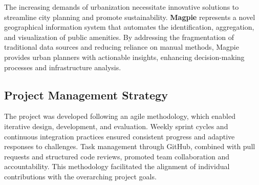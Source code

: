 The increasing demands of urbanization necessitate innovative solutions to
streamline city planning and promote sustainability. \textbf{Magpie} represents
a novel geographical information system that automates the identification,
aggregation, and visualization of public amenities. By addressing the
fragmentation of traditional data sources and reducing reliance on manual
methods, Magpie provides urban planners with actionable insights, enhancing
decision-making processes and infrastructure analysis.

\subsection{Project Management Strategy}
The project was developed following an agile methodology, which enabled
iterative design, development, and evaluation. Weekly sprint cycles and
continuous integration practices ensured consistent progress and adaptive
responses to challenges. Task management through GitHub, combined with pull
requests and structured code reviews, promoted team collaboration and
accountability. This methodology facilitated the alignment of individual
contributions with the overarching project goals.

